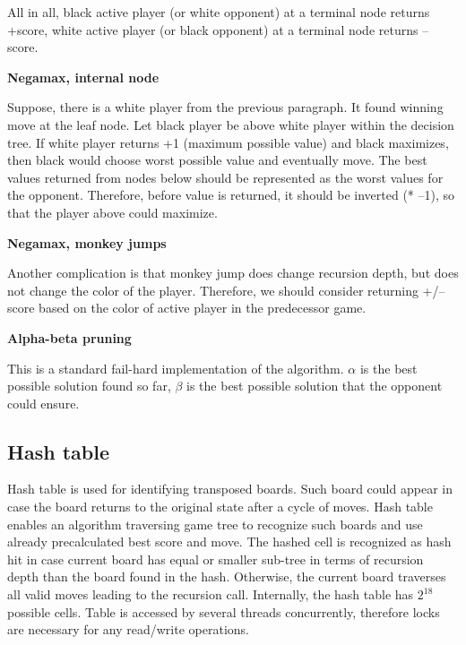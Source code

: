 \vspace{0.5em}

All in all, black active player (or white opponent) at a terminal node returns
+score, white active player (or black opponent) at a terminal node returns
--score.

\vspace{0.5em}

\textbf{Negamax, internal node}

\vspace{0.5em}

Suppose, there is a white player from the previous paragraph. It found winning
move at the leaf node. Let black player be above white player within the
decision tree. If white player returns +1 (maximum possible value) and black
maximizes, then black would choose worst possible value and eventually move.
The best values returned from nodes below should be represented as the worst
values for the opponent. Therefore, before value is returned, it should be
inverted (* --1), so that the player above could maximize.

\vspace{0.5em}

\textbf{Negamax, monkey jumps}

\vspace{0.5em}

Another complication is that monkey jump does change recursion depth, but
does not change the color of the player. Therefore, we should consider
returning +/-- score based on the color of active player in the predecessor
game.

\vspace{0.5em}

\textbf{Alpha-beta pruning}

\vspace{0.5em}

This is a standard fail-hard implementation of the algorithm. $\alpha$ is
the best possible solution found so far, $\beta$ is the best possible solution
that the opponent could ensure.

\vspace{0.5em}

\subsection{Hash table}

Hash table is used for identifying transposed boards. Such board could appear
in case the board returns to the original state after a cycle of moves. Hash
table enables an algorithm traversing game tree to recognize such boards and
use already precalculated best score and move. The hashed cell is recognized
as hash hit in case current board has equal or smaller sub-tree in terms of
recursion depth than the board found in the hash. Otherwise, the current board
traverses all valid moves leading to the recursion call. Internally, the hash
table has $2^{18}$ possible cells. Table is accessed by several threads
concurrently, therefore locks are necessary for any read/write operations.

